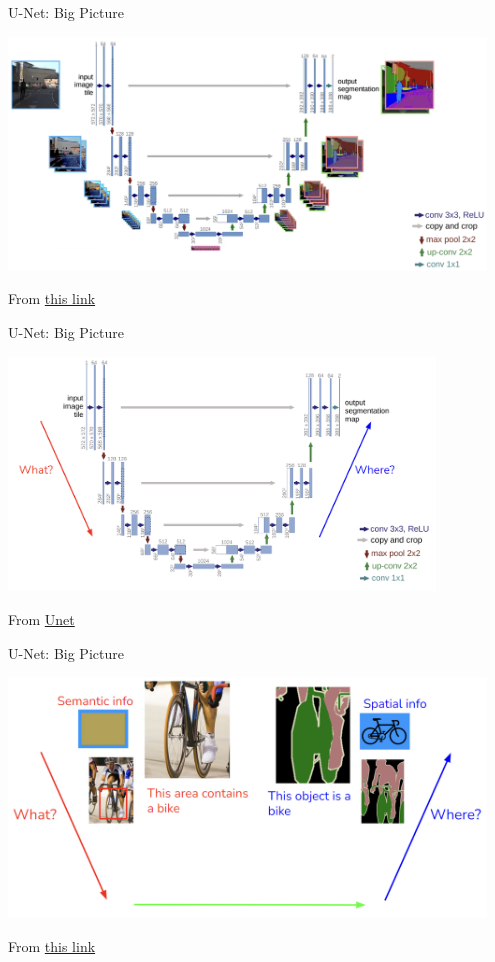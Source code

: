 \documentclass[serif, aspectratio=169]{beamer}
\begin{document}
\begin{frame}{U-Net: Big Picture}

    \begin{center}
        \includegraphics[width=0.95\textwidth]{pic/Unet big picture3.png} 
    \end{center}
    \tiny{From \href{https://www.youtube.com/watch?v=NhdzGfB1q74}{this link}}
\end{frame}



\begin{frame}{U-Net: Big Picture}

    \begin{center}
        \includegraphics[width=0.85\textwidth]{pic/Unet big picture4.png} 
    \end{center}
    \tiny{From \href{https://arxiv.org/abs/1505.04597}{Unet}}
\end{frame}



\begin{frame}{U-Net: Big Picture}

    \begin{center}
        \includegraphics[width=0.95\textwidth]{pic/Unet big picture5.png} 
    \end{center}
    \tiny{From \href{https://www.youtube.com/watch?v=NhdzGfB1q74}{this link}}
\end{frame}
\end{document}
